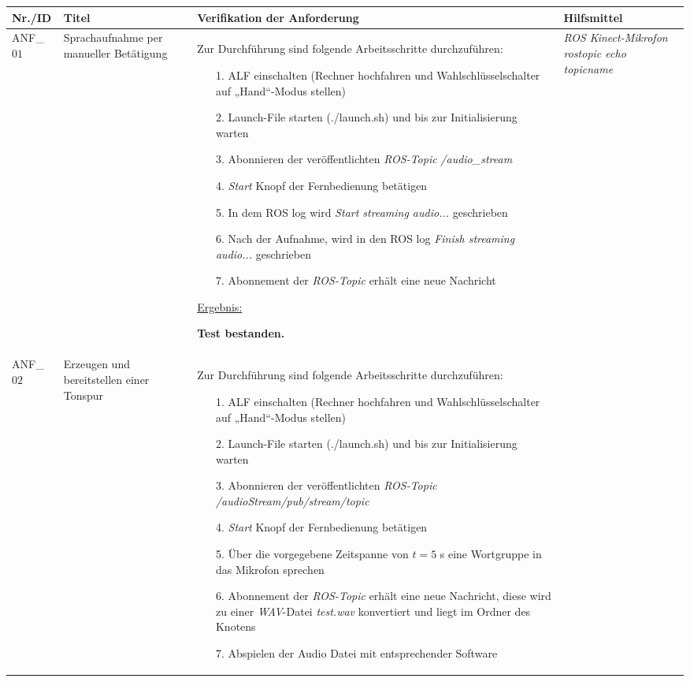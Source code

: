 \documentclass[12pt,a4paper,oneside,numbers=noenddot,captions=tableheading,toc=bibliography,openany,tikz,margin=5mm]{scrbook}
\begin{document}
	\begin{longtable}{|p{}|p{}|p{7cm}|p{}|} 
	\hline
	\textbf{Nr./ID} & \textbf{Titel} & \textbf{Verifikation der Anforderung} & \textbf{Hilfsmittel}\\
	\endhead


	\hline

ANF\_$01$ & Sprachaufnahme per manueller Betätigung & Zur Durchführung sind folgende Arbeitsschritte durchzuführen:
\begin{itemize}
	
	\item[1.]	ALF einschalten (Rechner hochfahren und Wahlschlüsselschalter auf „Hand“-Modus stellen)
	\item[2.]	Launch-File starten (./launch.sh) und bis zur Initialisierung warten
	\item[3.]	Abonnieren der veröffentlichten \textit{ROS-Topic} \textit{/audio_stream}
	\item[4.]	\textit{Start} Knopf der Fernbedienung betätigen
	\item[5.]	In dem ROS log wird \textit{Start streaming audio...} geschrieben
	\item[6.]	Nach der Aufnahme, wird in den ROS log \textit{Finish streaming audio...} geschrieben
	\item[7.]	Abonnement der \textit{ROS-Topic} erhält eine neue Nachricht
	
	
\end{itemize}

\underline{Ergebnis:}\newline
\newline

\textbf{Test bestanden.}	%
& \textit{ROS}\newline
\textit{Kinect-Mikrofon}\newline
\textit{rostopic echo topicname}\newline
\\
\hline

ANF\_$02$ & Erzeugen und bereitstellen einer Tonspur & Zur Durchführung sind folgende Arbeitsschritte durchzuführen:
\begin{itemize}
	
	\item[1.]	ALF einschalten (Rechner hochfahren und Wahlschlüsselschalter auf „Hand“-Modus stellen)
	\item[2.]	Launch-File starten (./launch.sh) und bis zur Initialisierung warten
	\item[3.]	Abonnieren der veröffentlichten \textit{ROS-Topic} \textit{/audioStream/pub/stream/topic}
	\item[4.]	\textit{Start} Knopf der Fernbedienung betätigen
	\item[5.]	Über die vorgegebene Zeitspanne von $t=5$ s eine Wortgruppe in das Mikrofon sprechen
	\item[6.]	Abonnement der \textit{ROS-Topic} erhält eine neue Nachricht, diese wird zu einer \textit{WAV}-Datei \textit{test.wav} konvertiert und liegt im Ordner des Knotens
	\item[7.]	Abspielen der Audio Datei mit entsprechender Software
\end{itemize}


\end{longtable}
\end{document}
